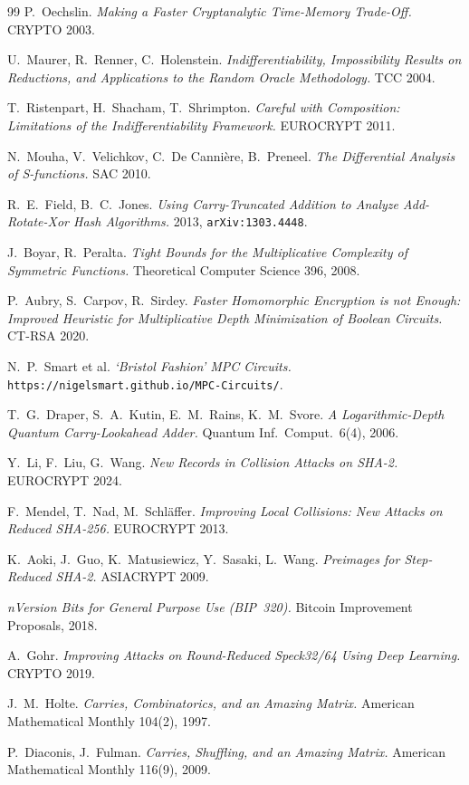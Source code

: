 \documentclass[11pt]{article}
\theoremstyle{remark}
\begin{document}
\begin{thebibliography}{99}
P.~Oechslin.
\emph{Making a Faster Cryptanalytic Time-Memory Trade-Off.}
CRYPTO 2003.

U.~Maurer, R.~Renner, C.~Holenstein.
\emph{Indifferentiability, Impossibility Results on Reductions, and
Applications to the Random Oracle Methodology.}
TCC 2004.

T.~Ristenpart, H.~Shacham, T.~Shrimpton.
\emph{Careful with Composition: Limitations of the Indifferentiability
Framework.}
EUROCRYPT 2011.

N.~Mouha, V.~Velichkov, C.~De Canni\`ere, B.~Preneel.
\emph{The Differential Analysis of S-functions.}
SAC 2010.

R.~E.~Field, B.~C.~Jones.
\emph{Using Carry-Truncated Addition to Analyze Add-Rotate-Xor Hash
Algorithms.}
2013, \texttt{arXiv:1303.4448}.

J.~Boyar, R.~Peralta.
\emph{Tight Bounds for the Multiplicative Complexity of Symmetric
Functions.}
Theoretical Computer Science 396, 2008.

P.~Aubry, S.~Carpov, R.~Sirdey.
\emph{Faster Homomorphic Encryption is not Enough: Improved Heuristic for
Multiplicative Depth Minimization of Boolean Circuits.}
CT-RSA 2020.

N.~P.~Smart et al.
\emph{`Bristol Fashion' MPC Circuits.}
\texttt{https://nigelsmart.github.io/MPC-Circuits/}.

T.~G.~Draper, S.~A.~Kutin, E.~M.~Rains, K.~M.~Svore.
\emph{A Logarithmic-Depth Quantum Carry-Lookahead Adder.}
Quantum Inf.\ Comput.\ 6(4), 2006.

Y.~Li, F.~Liu, G.~Wang.
\emph{New Records in Collision Attacks on SHA-2.}
EUROCRYPT 2024.

F.~Mendel, T.~Nad, M.~Schl\"affer.
\emph{Improving Local Collisions: New Attacks on Reduced SHA-256.}
EUROCRYPT 2013.

K.~Aoki, J.~Guo, K.~Matusiewicz, Y.~Sasaki, L.~Wang.
\emph{Preimages for Step-Reduced SHA-2.}
ASIACRYPT 2009.

\emph{nVersion Bits for General Purpose Use (BIP~320).}
Bitcoin Improvement Proposals, 2018.

A.~Gohr.
\emph{Improving Attacks on Round-Reduced Speck32/64 Using Deep Learning.}
CRYPTO 2019.

J.~M.~Holte.
\emph{Carries, Combinatorics, and an Amazing Matrix.}
American Mathematical Monthly 104(2), 1997.

P.~Diaconis, J.~Fulman.
\emph{Carries, Shuffling, and an Amazing Matrix.}
American Mathematical Monthly 116(9), 2009.

\end{thebibliography}
\end{document}
